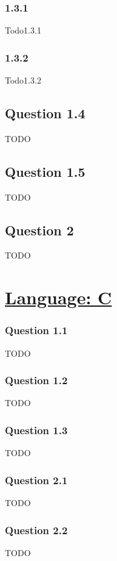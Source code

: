 \documentclass[a4paper,10pt]{article} %
\begin{document}
        \subsubsection*{\textbf{1.3.1}}
            Todo1.3.1
        \subsubsection*{\textbf{1.3.2}}
             Todo1.3.2
    
    \subsection*{\textbf{Question 1.4}}
        TODO
    \subsection*{\textbf{Question 1.5}}
        TODO
    \subsection*{\textbf{Question 2}}
        TODO

\section*{\underline{Language: C}}
    \subsubsection*{\textbf{Question 1.1}}
            TODO
    \subsubsection*{\textbf{Question 1.2}}
            TODO
    \subsubsection*{\textbf{Question 1.3}}
            TODO
    \subsubsection*{\textbf{Question 2.1}}
            TODO
    \subsubsection*{\textbf{Question 2.2}}
            TODO
\bigskip


\printbibliography

\end{document}
